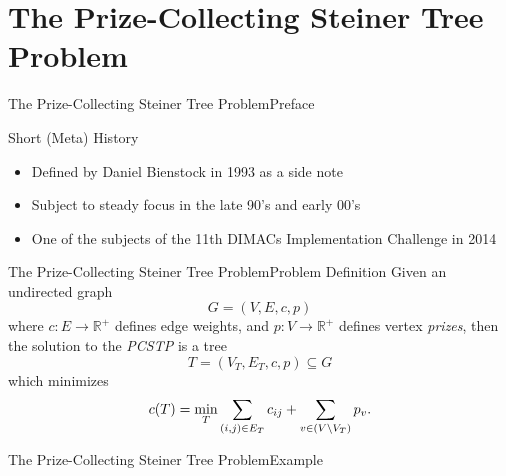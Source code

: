 \documentclass[rgb,dvipsnames]{beamer}
\newcommand{\RR}{\mathbb{R}}      %
\begin{document}
\section{The Prize-Collecting Steiner Tree Problem}
\begin{frame}{The Prize-Collecting Steiner Tree Problem}{Preface}
  \begin{block}{Short (Meta) History}
  \begin{itemize}[<+->]
  \item Defined by Daniel Bienstock in 1993 as a side note
  \item Subject to steady focus in the late 90's and early 00's
  \item One of the subjects of the 11th DIMACs Implementation Challenge in 2014
  \end{itemize}
  \end{block}
\end{frame}
\begin{frame}{The Prize-Collecting Steiner Tree Problem}{Problem Definition}
 Given an undirected graph
\[G = (V, E, c, p)\]
where $c: E \to \RR^+$ defines edge weights,
and $p: V \to \RR^+$ defines vertex \textit{prizes}, then the solution to the
\textit{PCSTP} is a tree
\[T = (V_T, E_T, c, p) \subseteq G\]
which minimizes
\[c(T) = \min_T \sum_{(i,j) \in E_T} c_{ij} + \sum_{v\in (V \setminus V_T)} p_v \textnormal{.} \]
\end{frame}

\begin{frame}{The Prize-Collecting Steiner Tree Problem}{Example}
  \centering
\end{frame}
\end{document}
